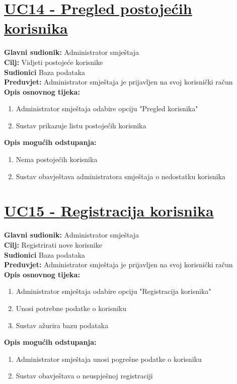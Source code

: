 \documentclass{article}
\begin{document}
	\section* {\underline{UC14 - Pregled postojećih korisnika}}
	\textbf{Glavni sudionik:} Administrator smještaja \\
	\textbf{Cilj:} Vidjeti postojeće korisnike\\
	\textbf{Sudionici} Baza podataka \\
	\textbf{Preduvjet:} Administrator smještaja je prijavljen na svoj korisnički račun \\
	\textbf{Opis osnovnog tijeka:}
	\begin{enumerate}
		\item Administrator smještaja odabire opciju "Pregled korisnika"
		\item Sustav prikazuje listu postojećih korisnika
	\end{enumerate}
	\textbf{Opis mogućih odstupanja:}
	\begin{enumerate}
		\item Nema postojećih korisnika
		\item Sustav obavještava administratora smještaja o nedostatku korisnika
	\end{enumerate}
	
	\section* {\underline{UC15 - Registracija korisnika}}
	\textbf{Glavni sudionik:} Administrator smještaja \\
	\textbf{Cilj:} Registrirati nove korisnike\\
	\textbf{Sudionici} Baza podataka \\
	\textbf{Preduvjet:} Administrator smještaja je prijavljen na svoj korisnički račun \\
	\textbf{Opis osnovnog tijeka:}
	\begin{enumerate}
		\item Administrator smještaja odabire opciju "Registracija korisnika"
		\item Unosi potrebne podatke o korisniku
		\item Sustav ažurira bazu podataka
	\end{enumerate}
	\textbf{Opis mogućih odstupanja:}
	\begin{enumerate}
		\item Administrator smještaja unosi pogrešne podatke o korisniku
		\item Sustav obavještava o neuspješnoj registraciji
	\end{enumerate}
	
\end{document}
